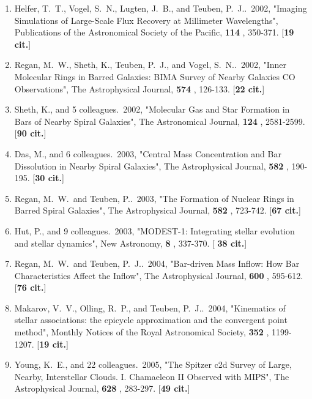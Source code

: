 \documentclass[11pt,letterpaper]{article}
\begin{document}
\begin{enumerate}[resume,label=\textbf{\arabic*}.]
\item  
Helfer, T.~T., Vogel, S.~N., Lugten, J.~B., and Teuben, P.~J..\  2002,  
"Imaging Simulations of Large-Scale Flux Recovery at Millimeter 
Wavelengths", Publications of the Astronomical Society of the Pacific,  
{\bf 114} , 350-371.  [{\bf 19 cit.}] 

\item  
Regan, M.~W., Sheth, K., Teuben, P.~J., and Vogel, S.~N..\  2002,  "Inner 
Molecular Rings in Barred Galaxies: BIMA Survey of Nearby Galaxies CO 
Observations", The Astrophysical Journal,  {\bf 574} , 126-133.  [{\bf 22 
cit.}] 

\item  
Sheth, K., and 5 colleagues.\  2002,  "Molecular Gas and Star Formation in 
Bars of Nearby Spiral Galaxies", The Astronomical Journal,  {\bf 124} , 
2581-2599.  [{\bf 90 cit.}] 

\item  
Das, M., and 6 colleagues.\  2003,  "Central Mass Concentration and Bar 
Dissolution in Nearby Spiral Galaxies", The Astrophysical Journal,  {\bf 
582} , 190-195.  [{\bf 30 cit.}] 

\item  
Regan, M.~W.~and Teuben, P..\  2003,  "The Formation of Nuclear Rings in 
Barred Spiral Galaxies", The Astrophysical Journal,  {\bf 582} , 723-742.  
[{\bf 67 cit.}] 

\item  
Hut, P., and 9 colleagues.\  2003,  "MODEST-1: Integrating stellar 
evolution and stellar dynamics", New Astronomy,  {\bf 8} , 337-370.  [{\bf 
38 cit.}] 

\item  
Regan, M.~W.~and Teuben, P.~J..\  2004,  "Bar-driven Mass Inflow: How Bar 
Characteristics Affect the Inflow", The Astrophysical Journal,  {\bf 600} , 
595-612.  [{\bf 76 cit.}] 

\item  
Makarov, V.~V., Olling, R.~P., and Teuben, P.~J..\  2004,  "Kinematics of 
stellar associations: the epicycle approximation and the convergent point 
method", Monthly Notices of the Royal Astronomical Society,  {\bf 352} , 
1199-1207.  [{\bf 19 cit.}] 

\item  
Young, K.~E., and 22 colleagues.\  2005,  "The Spitzer c2d Survey of Large, 
Nearby, Interstellar Clouds. I. Chamaeleon II Observed with MIPS", The 
Astrophysical Journal,  {\bf 628} , 283-297.  [{\bf 49 cit.}] 


\end{enumerate}
\end{document}
